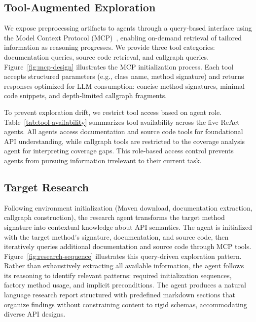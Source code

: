 \subsection{Tool-Augmented Exploration}%
\label{subsec:tool-augmented-exploration}

%
We expose preprocessing artifacts to agents through a query-based interface using the Model Context Protocol (MCP)~\cite{mcp}, enabling on-demand retrieval of tailored information as reasoning progresses.
%
We provide three tool categories: documentation queries, source code retrieval, and callgraph queries. Figure~\ref{fig:mcp-design} illustrates the MCP initialization process. Each tool accepts structured parameters (e.g., class name, method signature) and returns responses optimized for LLM consumption: concise method signatures, minimal code snippets, and depth-limited callgraph fragments.

To prevent exploration drift, we restrict tool access based on agent role. Table~\ref{tab:tool-availability} summarizes tool availability across the five ReAct agents. All agents access documentation and source code tools for foundational API understanding, while callgraph tools are restricted to the coverage analysis agent for interpreting coverage gaps. This role-based access control prevents agents from pursuing information irrelevant to their current task.

% 
%
\subsection{Target Research}%
\label{subsec:target-research}

Following environment initialization (Maven download, documentation extraction, callgraph construction), the research agent transforms the target method signature into contextual knowledge about API semantics. The agent is initialized with the target method's signature, documentation, and source code, then iteratively queries additional documentation and source code through MCP tools. Figure~\ref{fig:research-sequence} illustrates this query-driven exploration pattern. Rather than exhaustively extracting all available information, the agent follows its reasoning to identify relevant patterns: required initialization sequences, factory method usage, and implicit preconditions. The agent produces a natural language research report structured with predefined markdown sections that organize findings without constraining content to rigid schemas, accommodating diverse API designs.

